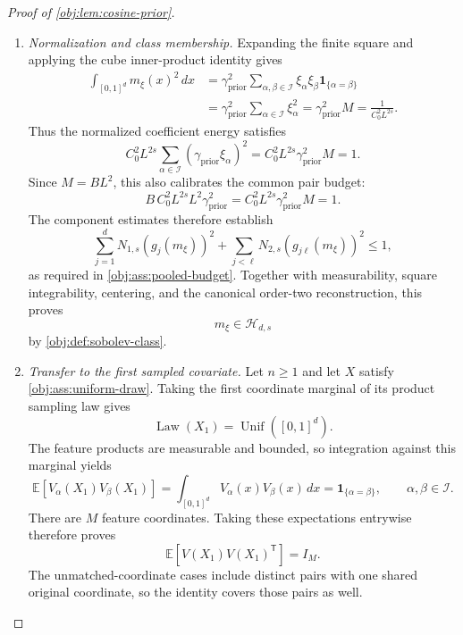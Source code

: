 \begin{proof}[Proof of \cref{obj:lem:cosine-prior}]
\begin{enumerate}
\item \emph{Normalization and class membership.}
Expanding the finite square and applying the cube inner-product identity
gives
\[
\begin{aligned}
\int_{[0,1]^d}m_\xi(x)^2\,dx
&=\gamma_{\mathrm{prior}}^2
 \sum_{\alpha,\beta\in\mathcal I}
 \xi_\alpha\xi_\beta\mathbf1_{\{\alpha=\beta\}}\\
&=\gamma_{\mathrm{prior}}^2
 \sum_{\alpha\in\mathcal I}\xi_\alpha^2
=\gamma_{\mathrm{prior}}^2M
=\frac{1}{C_0^2L^{2s}}.
\end{aligned}
\]
Thus the normalized coefficient energy satisfies
\[
C_0^2L^{2s}
 \sum_{\alpha\in\mathcal I}
  (\gamma_{\mathrm{prior}}\xi_\alpha)^2
=C_0^2L^{2s}\gamma_{\mathrm{prior}}^2M
=1.
\]
Since \(M=BL^2\), this also calibrates the common pair budget:
\[
B\,C_0^2L^{2s}L^2\gamma_{\mathrm{prior}}^2
=C_0^2L^{2s}\gamma_{\mathrm{prior}}^2M
=1.
\]
The component estimates therefore establish
\[
\sum_{j=1}^dN_{1,s}(g_j(m_\xi))^2
+\sum_{j<\ell}N_{2,s}(g_{j\ell}(m_\xi))^2
\leq1,
\]
as required in \cref{obj:ass:pooled-budget}. Together with measurability,
square integrability, centering, and the canonical order-two
reconstruction, this proves
\[
m_\xi\in\mathcal H_{d,s}
\]
by \cref{obj:def:sobolev-class}.

\item \emph{Transfer to the first sampled covariate.}
Let \(n\geq1\) and let \(X\) satisfy \cref{obj:ass:uniform-draw}.
Taking the first coordinate marginal of its product sampling law gives
\[
\operatorname{Law}(X_1)=\operatorname{Unif}([0,1]^d).
\]
The feature products are measurable and bounded, so integration against
this marginal yields
\[
\mathbb E[V_\alpha(X_1)V_\beta(X_1)]
=\int_{[0,1]^d}V_\alpha(x)V_\beta(x)\,dx
=\mathbf1_{\{\alpha=\beta\}},
\qquad \alpha,\beta\in\mathcal I.
\]
There are \(M\) feature coordinates. Taking these expectations entrywise
therefore proves
\[
\mathbb E[V(X_1)V(X_1)^{\mathsf T}]=I_M.
\]
The unmatched-coordinate cases include distinct pairs with one shared
original coordinate, so the identity covers those pairs as well.
\end{enumerate}
\end{proof}
